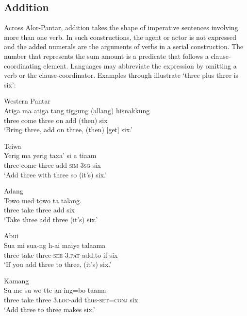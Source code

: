 \subsection{Addition}
\label{sec:8:Addition}
Across Alor-Pantar, addition takes the shape of imperative sentences involving more than one verb. In such constructions, the agent or actor is not expressed and the added numerals are the arguments of verbs in a serial construction. The number that represents the sum amount is a predicate that follows a clause-coordinating element. Languages may abbreviate the expression by omitting a verb or the clause-coordinator. Examples  through  illustrate `three plus three is six':


\ea%
\label{bkm:Ref342663714}
{\upshape Western Pantar}\\
\gll Atiga  ma{\upshapefootnotemark}  atiga  tang  tiggung  (allang)  hisnakkung\\  
   three   come  three  on  add  (then)  six \\
\glt  `Bring three, add on three, (then) [get] six.'
\z


\ea
\label{ex:8:1237}
 
{\upshape Teiwa}\\
 \gll Yerig  ma  yerig  taxa'   si  a  tiaam\\
   three  come  three  add  \textsc{sim}  \textsc{3sg} six \\
 \glt`Add three with three so (it's) six.'
\z
 
\ea
\label{ex:8:1238}
{\upshape Adang}\\ 
 \gll Towo  med  towo  ta  talang.\\
    three   take   three   add   six\\
 \glt `Take three add three (it's) six.'
\z

\ea
\label{ex:8:1239}
{\upshape Abui}\\
 \gll Sua  mi  sua-ng  h-ai  maiye  talaama\\
  three  take  three-\textsc{see}  \textsc{3.pat}{}-add.to  if  six \\
 \glt  `If you add three to three, (it's) six.'  
\z




\ea%
\label{bkm:Ref342663723}
{\upshape Kamang}\\
\gll   Su  me  su  wo-tte  an-ing=bo  taama\\  
   three   take  three  3.\textsc{loc}{}-add  thus-\textsc{set}=\textsc{conj}  six  \\
\glt `Add three to three makes six.'  
\z



